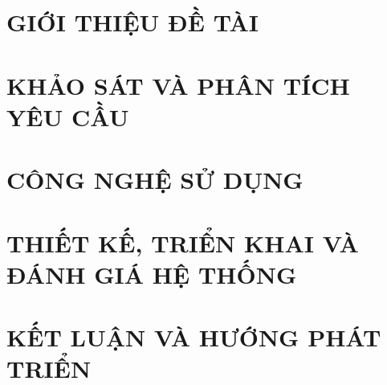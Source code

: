 \documentclass[a4paper,13pt,3p,twoside]{report}
\renewcommand{\bibname}{Danh_sach_tai_lieu_tham_khao}
\theoremstyle{definition}
\begin{document}
\glsaddall 
 \renewcommand*{\glossaryname}{Danh sách thuật ngữ}
\renewcommand*{\acronymname}{DANH MỤC THUẬT NGỮ VÀ TỪ VIẾT TẮT}
\renewcommand*{\entryname}{Thuật ngữ}
\renewcommand*{\descriptionname}{Ý nghĩa}
\printnoidxglossaries


% 


\newpage
{}

\pagestyle{fancy}
\fancyhf{}
\fancyhead[RE, LO]{\leftmark}
\fancyfoot[RE, LO]{\thepage}

\chapter{GIỚI THIỆU ĐỀ TÀI}
\label{chapter:Introduction}

\newpage
\chapter{KHẢO SÁT VÀ PHÂN TÍCH YÊU CẦU}
\label{chapter:Related_works}



\newpage
\chapter{CÔNG NGHỆ SỬ DỤNG}
\label{chapter:Methodology}


\newpage
\chapter{THIẾT KẾ, TRIỂN KHAI VÀ ĐÁNH GIÁ HỆ THỐNG}
\label{chapter:Experiment}


\newpage
\chapter{KẾT LUẬN VÀ HƯỚNG PHÁT TRIỂN}
\label{chapter:SolutionAndContribution}


\newpage
\renewcommand\bibname{TÀI LIỆU THAM KHẢO}
\printbibliography
{}
\end{document}

